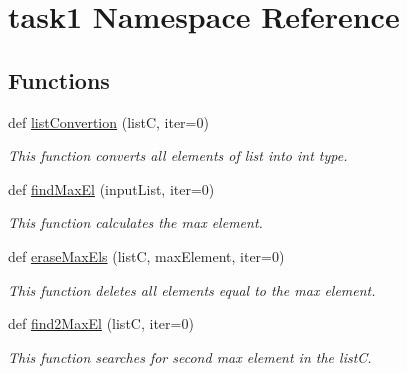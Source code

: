 \hypertarget{namespacetask1}{}\section{task1 Namespace Reference}
\label{namespacetask1}
\subsection*{Functions}
\begin{DoxyCompactItemize}
\item 
def \hyperlink{namespacetask1_a417fc33e3a3db579a8e974cbd8b80978}{list\+Convertion} (listC, iter=0)
\begin{DoxyCompactList}\small\item\em This function converts all elements of list into int type. \end{DoxyCompactList}\item 
def \hyperlink{namespacetask1_ab5289f16454d53dc123bcdaa993b8f34}{find\+Max\+El} (input\+List, iter=0)
\begin{DoxyCompactList}\small\item\em This function calculates the max element. \end{DoxyCompactList}\item 
def \hyperlink{namespacetask1_ac3ea594388e8ff9b77bd1995bf070998}{erase\+Max\+Els} (listC, max\+Element, iter=0)
\begin{DoxyCompactList}\small\item\em This function deletes all elements equal to the max element. \end{DoxyCompactList}\item 
def \hyperlink{namespacetask1_ad20e69875516dbe574f249cd46b31907}{find2\+Max\+El} (listC, iter=0)
\begin{DoxyCompactList}\small\item\em This function searches for second max element in the listC. \end{DoxyCompactList}\end{DoxyCompactItemize}
